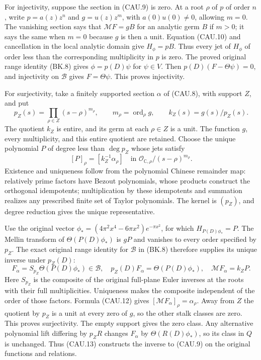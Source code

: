 For injectivity, suppose the section in (CAU.9) is zero.  At a root
$\rho$ of $p$ of order $n$, write $p=a(z)z^n$ and $g=u(z)z^m$,
with $a(0)u(0)\ne0$, allowing $m=0$.  The vanishing section says that
$\mathcal MF=gB$ for an analytic germ $B$ if $m>0$; it says the same
when $m=0$ because $g$ is then a unit.  Equation (CAU.10) and cancellation
in the local analytic domain give $H_\phi=pB$.  Thus every jet of
$H_\phi$ of order less than the corresponding multiplicity in $p$ is
zero.  The proved original range identity (BK.8) gives
$\phi=p(D)\psi$ for $\psi\in V$.  Then
$p(D)(F-\Theta\psi)=0$, and injectivity on $\mathscr B$ gives
$F=\Theta\psi$.  This proves injectivity.

For surjectivity, take a finitely supported section $\alpha$ of (CAU.8),
with support $Z$, and put
\[
 p_Z(s)=\prod_{\rho\in Z}(s-\rho)^{m_\rho},\qquad
 m_\rho=\operatorname{ord}_\rho g,\qquad
 k_Z(s)=g(s)/p_Z(s).                                         \tag{CAU.11}
\]
The quotient $k_Z$ is entire, and its germ at each $\rho\in Z$ is a unit.
The function $g$, every multiplicity, and this entire quotient are retained.
Choose the unique polynomial $P$ of degree less than $\deg p_Z$ whose
jets satisfy
\[
 [P]_\rho=[k_Z^{-1}\alpha_\rho]
       \quad\text{in }\mathcal O_{\mathbb C,\rho}/(s-\rho)^{m_\rho}.
                                                               \tag{CAU.12}
\]
Existence and uniqueness follow from the polynomial Chinese remainder
map: relatively prime factors have Bezout polynomials, whose products
construct the orthogonal idempotents; multiplication by these idempotents
and summation realizes any prescribed finite set of Taylor polynomials.
The kernel is $(p_Z)$, and degree reduction gives the unique representative.

Use the original vector
$\phi_*=(4\pi^2x^4-6\pi x^2)e^{-\pi x^2}$, for which
$H_{P(D)\phi_*}=P$.  The Mellin transform of
$\Theta(P(D)\phi_*)$ is $gP$ and vanishes to every order specified by
$p_Z$.  The exact original range identity for $\mathscr B$ in (BK.8)
therefore supplies its unique inverse under $p_Z(D)$:
\[
 F_\alpha=S_{p_Z}\Theta(P(D)\phi_*)\in\mathscr B,
 \quad p_Z(D)F_\alpha=\Theta(P(D)\phi_*),\quad
 \mathcal MF_\alpha=k_ZP.                                    \tag{CAU.13}
\]
Here $S_{p_Z}$ is the composite of the original full-plane Euler inverses
at the roots with their full multiplicities.  Uniqueness makes the
composite independent of the order of those factors.  Formula (CAU.12)
gives $[\mathcal MF_\alpha]_\rho=\alpha_\rho$.  Away from $Z$ the
quotient by $p_Z$ is a unit at every zero of $g$, so the other stalk
classes are zero.  This proves surjectivity.  The empty support gives
the zero class.  Any alternative polynomial lift differing by $p_ZR$
changes $F_\alpha$ by $\Theta(R(D)\phi_*)$, so its class in $Q$ is
unchanged.  Thus (CAU.13) constructs the inverse to (CAU.9) on the
original functions and relations.

